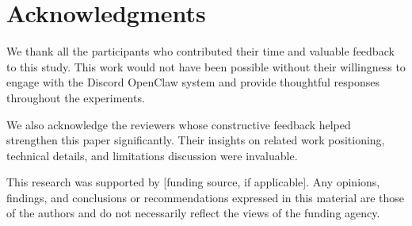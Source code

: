 \section*{Acknowledgments}

We thank all the participants who contributed their time and valuable feedback to this study. This work would not have been possible without their willingness to engage with the Discord OpenClaw system and provide thoughtful responses throughout the experiments.

We also acknowledge the reviewers whose constructive feedback helped strengthen this paper significantly. Their insights on related work positioning, technical details, and limitations discussion were invaluable.

This research was supported by [funding source, if applicable]. Any opinions, findings, and conclusions or recommendations expressed in this material are those of the authors and do not necessarily reflect the views of the funding agency.